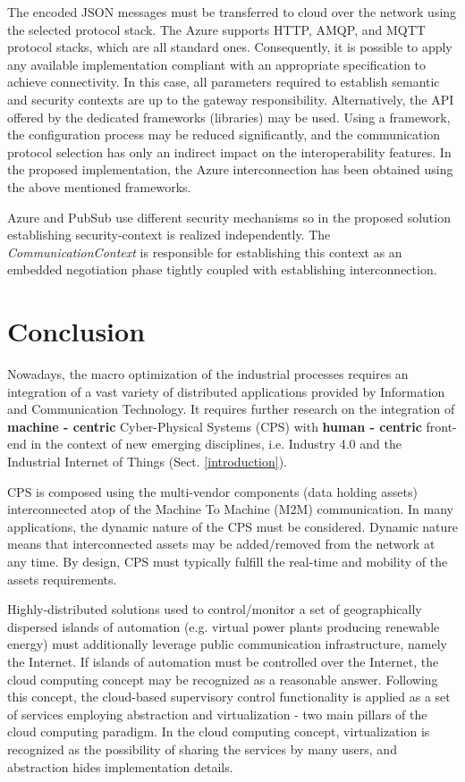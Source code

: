 \documentclass[runningheads]{llncs}
\begin{document}
The encoded JSON messages must be transferred to cloud over the network using the selected protocol stack. The Azure supports HTTP, AMQP, and MQTT protocol stacks, which are all standard ones. Consequently, it is possible to apply any available implementation compliant with an appropriate specification to achieve connectivity. In this case, all parameters required to establish semantic and security contexts are up to the gateway responsibility. Alternatively, the API offered by the dedicated frameworks (libraries) may be used. Using a framework, the configuration process may be reduced significantly, and the communication protocol selection has only an indirect impact on the interoperability features. In the proposed implementation, the Azure interconnection has been obtained using the above mentioned frameworks.

Azure and PubSub use different security mechanisms so in the proposed solution establishing security-context is realized independently. The \emph{CommunicationContext} is responsible for establishing this context as an embedded negotiation phase tightly coupled with establishing interconnection.

\section{Conclusion}\label{section.conclusion}

Nowadays, the macro optimization of the industrial processes requires an integration of a vast variety of distributed applications provided by Information and Communication Technology. It requires further research on the integration of \textbf{machine - centric} Cyber-Physical Systems (CPS) with \textbf{human - centric} front-end in the context of new emerging disciplines, i.e. Industry 4.0 and the Industrial Internet of Things (Sect. \ref{introduction}).

CPS is composed using the multi-vendor components (data holding assets) interconnected atop of the Machine To Machine (M2M) communication. In many applications, the dynamic nature of the CPS must be considered. Dynamic nature means that interconnected assets may be added/removed from the network at any time. By design, CPS must typically fulfill the real-time and mobility of the assets requirements.

Highly-distributed solutions used to control/monitor a set of geographically dispersed islands of automation (e.g. virtual power plants producing renewable energy) must additionally leverage public communication infrastructure, namely the Internet. If islands of automation must be controlled over the Internet, the cloud computing concept may be recognized as a reasonable answer. Following this concept, the cloud-based supervisory control functionality is applied as a set of services employing abstraction and virtualization - two main pillars of the cloud computing paradigm. In the cloud computing concept, virtualization is recognized as the possibility of sharing the services by many users, and abstraction hides implementation details.
\end{document}

